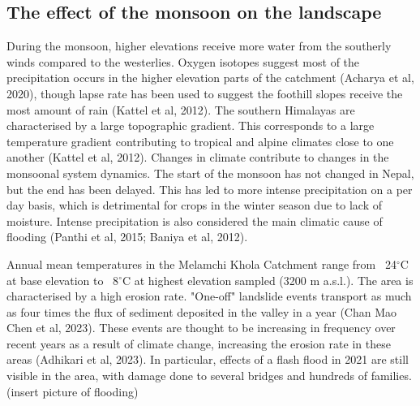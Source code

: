 \bsk

\subsection{The effect of the monsoon on the landscape}
During the monsoon, higher elevations receive more water from the southerly winds compared to the westerlies. Oxygen isotopes suggest most of the precipitation occurs in the higher elevation parts of the catchment (Acharya et al, 2020), though lapse rate has been used to suggest the foothill slopes receive the most amount of rain (Kattel et al, 2012). The southern Himalayas are characterised by a large topographic gradient. This corresponds to a large temperature gradient contributing to tropical and alpine climates close to one another (Kattel et al, 2012). Changes in climate contribute to changes in the monsoonal system dynamics. The start of the monsoon has not changed in Nepal, but the end has been delayed. This has led to more intense precipitation on a per day basis, which is detrimental for crops in the winter season due to lack of moisture. Intense precipitation is also considered the main climatic cause of flooding (Panthi et al, 2015; Baniya et al, 2012). 

\bsk

Annual mean temperatures in the Melamchi Khola Catchment range from ~24$^{\circ}$C at base elevation to ~8$^{\circ}$C at highest elevation sampled (3200 m a.s.l.). The area is characterised by a high erosion rate. "One-off" landslide events transport as much as four times the flux of sediment deposited in the valley in a year (Chan Mao Chen et al, 2023). These events are thought to be increasing in frequency over recent years as a result of climate change, increasing the erosion rate in these areas (Adhikari et al, 2023). In particular, effects of a flash flood in 2021 are still visible in the area, with damage done to several bridges and hundreds of families. (insert picture of flooding)









